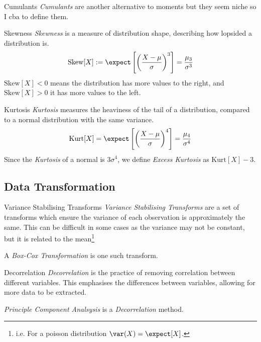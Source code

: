 \documentclass[11pt,a4paper]{article}
\begin{document}
  \begin{remark}{Cumulants}
    \textit{Cumulants} are another alternative to moments but they seem niche so I cba to define them.
  \end{remark}

  \begin{definition}{Skewness}
    \textit{Skewness} is a measure of distribution shape, describing how lopsided a distribution is.
    \[ \text{Skew}[X]:=\expect\left[\left(\frac{X-\mu}{\sigma}\right)^3\right]=\frac{\mu_3}{\sigma^3} \]
    $\text{Skew}[X]<0$ means the distribution has more values to the right, and $\text{Skew}[X]>0$ it has more values to the left.
  \end{definition}

  \begin{definition}{Kurtosis}
    \textit{Kurtosis} measures the heaviness of the tail of a distribution, compared to a normal distribution with the same variance.
    \[ \text{Kurt}[X]=\expect\left[\left(\frac{X-\mu}{\sigma}\right)^4\right]=\frac{\mu_4}{\sigma^4} \]
    Since the \textit{Kurtosis} of a normal is $3\sigma^4$, we define \textit{Excess Kurtosis} as $\text{Kurt}[X]-3$.
  \end{definition}

\subsection{Data Transformation}

  \begin{definition}{Variance Stabilising Transforms}
    \textit{Variance Stabilising Transforms} are a set of transforms which ensure the variance of each observation is approximately the same. This can be difficult in some cases as the variance may not be constant, but it is related to the mean\footnote{i.e. For a poisson distribution $\var(X)=\expect[X]$.}
    \par A \textit{Box-Cox Transformation} is one such transform.
  \end{definition}

  \begin{definition}{Decorrelation}
    \textit{Decorrelation} is the practice of removing correlation between different variables. This emphasises the differences between variables, allowing for more data to be extracted.
    \par \textit{Principle Component Analsysis} is a \textit{Decorrelation} method.
  \end{definition}
\end{document}
